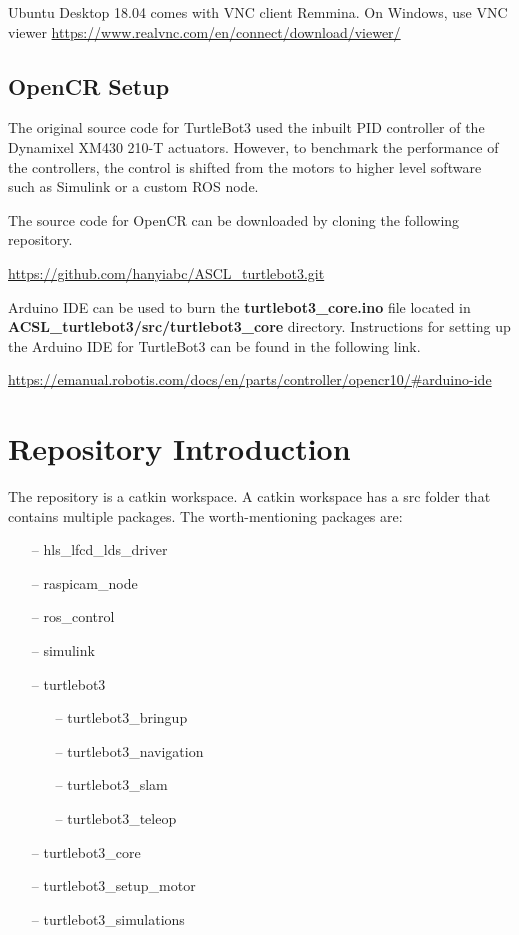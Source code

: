 \documentclass[12]{article}
\begin{document}
Ubuntu Desktop 18.04 comes with VNC client Remmina.
On Windows, use VNC viewer
\url{https://www.realvnc.com/en/connect/download/viewer/}
\subsection{OpenCR Setup}

The original source code for TurtleBot3 used the inbuilt PID controller of the Dynamixel XM430 210-T actuators. However, to benchmark the performance of the controllers, the control is shifted from the motors to higher level software such as Simulink or a custom ROS node.

The source code for OpenCR can be downloaded by cloning the following repository.

\url {https://github.com/hanyiabc/ASCL_turtlebot3.git}

Arduino IDE can be used to burn the \textbf{turtlebot3\_core.ino} file located in \textbf{ACSL\_turtlebot3/src/turtlebot3\_core} directory. Instructions for setting up the Arduino IDE for TurtleBot3 can be found in the following link.

\url {https://emanual.robotis.com/docs/en/parts/controller/opencr10/#arduino-ide}

\newpage
\section{Repository Introduction}
The repository is a catkin workspace. A catkin workspace has a src folder that contains multiple packages. The worth-mentioning packages are:
\begin{itemize}
	\item[--] hls\_lfcd\_lds\_driver
    \item[--] raspicam\_node
    \item[--] ros\_control
    \item[--] simulink
    \item[--] turtlebot3
    \begin{itemize}
        \item[--] turtlebot3\_bringup
        \item[--] turtlebot3\_navigation
        \item[--] turtlebot3\_slam
        \item[--] turtlebot3\_teleop
    \end {itemize}
    \item[--] turtlebot3\_core
    \item[--] turtlebot3\_setup\_motor
    \item[--] turtlebot3\_simulations
\end{itemize} 
\end{document}
